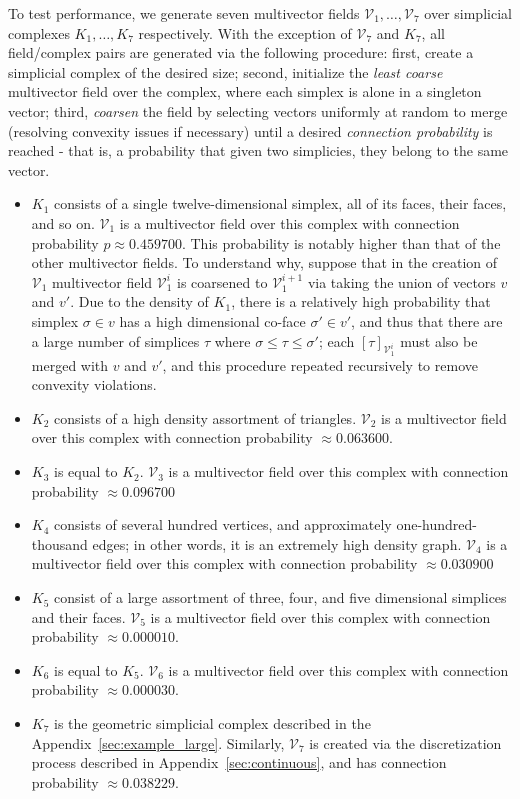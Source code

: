 \documentclass[a4paper,english,cleveref]{article}
\theoremstyle{plain}
\newcounter{li}
\newcommand{\mv}{\mathcal{V}}
\begin{document}
To test performance, we generate seven multivector fields $\mv_1, \ldots, \mv_7$ over simplicial complexes $K_1, \ldots, K_7$ respectively. With the exception of $\mv_7$ and $K_7$, all field/complex pairs are generated via the following procedure: first, create a simplicial complex of the desired size; second, initialize the \textit{least coarse} multivector field over the complex, where each simplex is alone in a singleton vector; third, \textit{coarsen} the field by selecting vectors uniformly at random to merge (resolving convexity issues if necessary) until a desired \textit{connection probability} is reached - that is, a probability that given two simplicies, they belong to the same vector.
    \begin{itemize}
        \item $K_1$ consists of a single twelve-dimensional simplex, all of its faces, their faces, and so on. $\mv_1$ is a multivector field over this complex with connection probability $p \approx 0.459700$. This probability is notably higher than that of the other multivector fields. To understand why, suppose that in the creation of $\mv_1$ multivector field $\mv_1^i$ is coarsened to $\mv_1^{i+1}$ via taking the union of vectors $v$ and $v'$. Due to the density of $K_1$, there is a relatively high probability that simplex $\sigma \in v$ has a high dimensional co-face $\sigma' \in v'$, and thus that there are a large number of simplices $\tau$ where $\sigma \leq \tau \leq \sigma'$; each $[\tau]_{\mv_1^{i}}$ must also be merged with $v$ and $v'$, and this procedure repeated recursively to remove convexity violations.

        \item $K_2$ consists of a high density assortment of triangles. $\mv_2$ is a multivector field over this complex with connection probability $ \approx 0.063600$.
        \item $K_3$ is equal to $K_2$. $\mv_3$ is a multivector field over this complex with connection probability $ \approx 0.096700$
        \item $K_4$ consists of several hundred vertices, and approximately one-hundred-thousand edges; in other words, it is an extremely high density graph. $\mv_4$ is a multivector field over this complex with connection probability $ \approx 0.030900$
        
        \item $K_5$ consist of a large assortment of three, four, and five dimensional simplices and their faces. $\mv_5$ is a multivector field over this complex with connection probability $ \approx 0.000010$.
        \item $K_6$ is equal to $K_5$. $\mv_6$ is a multivector field over this complex with connection probability $ \approx 0.000030$.

        \item $K_7$ is the geometric simplicial complex described in the Appendix~\ref{sec:example_large}. Similarly, $\mv_7$ is created via the discretization process described in Appendix~\ref{sec:continuous}, and has connection probability $  \approx 0.038229$.
    \end{itemize}
\end{document}
